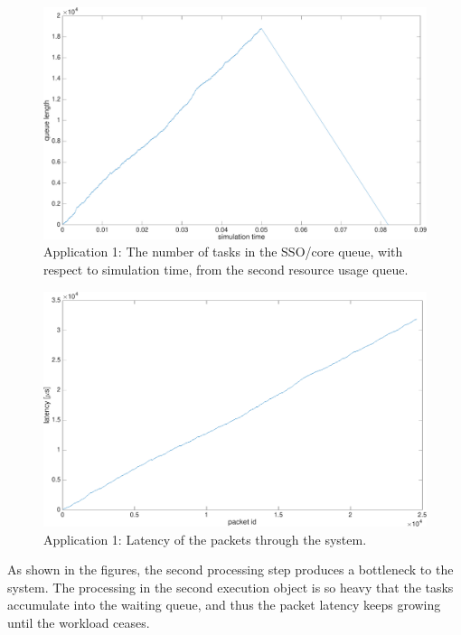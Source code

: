 \begin{figure}[]
  \begin{center}
    \includegraphics[width=\textwidth]{images/experiment/app1-queue2.pdf}
    \caption{Application 1: The number of tasks in the SSO/core queue, with respect to simulation time, from the second resource usage queue.}
    \label{fig:app1-queue2}
  \end{center}
\end{figure}

\begin{figure}[]
  \begin{center}
    \includegraphics[width=\textwidth]{images/experiment/app1-latency.pdf}
    \caption{Application 1: Latency of the packets through the system.}
    \label{fig:app1-latency}
  \end{center}
\end{figure}

As shown in the figures, the second processing step produces a bottleneck to the system. The processing in the second execution object is so heavy that the tasks accumulate into the waiting queue, and thus the packet latency keeps growing until the workload ceases.

